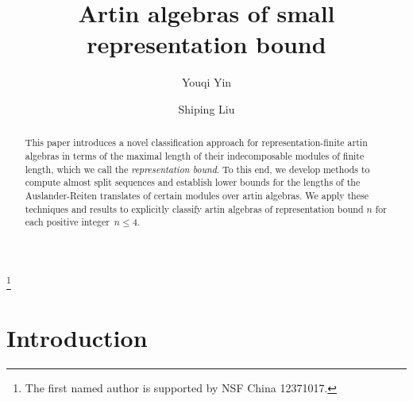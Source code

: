 \documentclass[10pt]{amsart}
\theoremstyle{definition}
\begin{document}
\title[Representation bound]{\sc Artin algebras of small representation bound}

\vspace{5pt}

\author[Y. Yin]{Youqi Yin}

\author[S. Liu]{Shiping Liu \vspace{-10pt}}

\address{Youqi Yin \\ Departement of mathematics, Shaoxing University, Shaoxing, China.}

\address{{\it Corresponding author}: Shiping Liu \\ D\'epartement de math\'ematiques, Universit\'e de Sherbrooke, Sherbrooke, Qu\'ebec, 
Canada.}



\thanks{The first named author is supported by NSF China 12371017.}


\begin{abstract}

\vspace{15pt}

This paper introduces a novel classification approach for represen\-tation-finite artin algebras in terms of the maximal length of their indecomposable modules of finite length, which we call the \emph{representation bound}. To this end, we develop methods to compute almost split sequences and establish lower bounds for the lengths of the Auslander-Reiten translates of certain mo\-dules over artin algebras. We apply these techniques and results to explicitly classify artin algebras of representation bound $n$ for each positive integer~$n \le 4.$

\vspace{-15pt}

\end{abstract}

\maketitle

\section*{Introduction}
\end{document}
